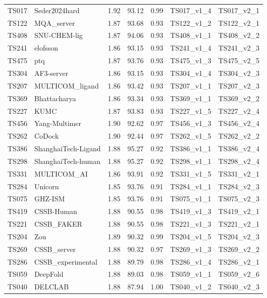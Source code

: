 \begin{longtable}{lllllll}
TS017 & Seder2024hard & 1.92 & 93.12 & 0.99 & TS017\_v1\_4 & TS017\_v2\_1 \\ 
TS122 & MQA\_server & 1.87 & 93.68 & 0.93 & TS122\_v1\_2 & TS122\_v2\_1 \\ 
TS408 & SNU-CHEM-lig & 1.87 & 94.06 & 0.93 & TS408\_v1\_1 & TS408\_v2\_2 \\ 
TS241 & elofsson & 1.86 & 93.15 & 0.93 & TS241\_v1\_4 & TS241\_v2\_3 \\ 
TS475 & ptq & 1.87 & 93.76 & 0.93 & TS475\_v1\_3 & TS475\_v2\_5 \\ 
TS304 & AF3-server & 1.86 & 93.15 & 0.93 & TS304\_v1\_4 & TS304\_v2\_3 \\ 
TS207 & MULTICOM\_ligand & 1.86 & 93.42 & 0.93 & TS207\_v1\_1 & TS207\_v2\_3 \\ 
TS369 & Bhattacharya & 1.86 & 93.34 & 0.93 & TS369\_v1\_1 & TS369\_v2\_2 \\ 
TS227 & KUMC & 1.87 & 93.83 & 0.93 & TS227\_v1\_5 & TS227\_v2\_4 \\ 
TS456 & Yang-Multimer & 1.90 & 92.62 & 0.97 & TS456\_v1\_3 & TS456\_v2\_4 \\ 
TS262 & CoDock & 1.90 & 92.44 & 0.97 & TS262\_v1\_5 & TS262\_v2\_2 \\ 
TS386 & ShanghaiTech-Ligand & 1.88 & 95.27 & 0.92 & TS386\_v1\_1 & TS386\_v2\_4 \\ 
TS298 & ShanghaiTech-human & 1.88 & 95.27 & 0.92 & TS298\_v1\_1 & TS298\_v2\_4 \\ 
TS331 & MULTICOM\_AI & 1.86 & 93.91 & 0.92 & TS331\_v1\_5 & TS331\_v2\_1 \\ 
TS284 & Unicorn & 1.85 & 93.76 & 0.91 & TS284\_v1\_1 & TS284\_v2\_3 \\ 
TS075 & GHZ-ISM & 1.85 & 93.76 & 0.91 & TS075\_v1\_1 & TS075\_v2\_3 \\ 
TS419 & CSSB-Human & 1.88 & 90.55 & 0.98 & TS419\_v1\_3 & TS419\_v2\_1 \\ 
TS221 & CSSB\_FAKER & 1.88 & 90.55 & 0.98 & TS221\_v1\_3 & TS221\_v2\_1 \\ 
TS204 & Zou & 1.89 & 90.32 & 0.99 & TS204\_v1\_5 & TS204\_v2\_3 \\ 
TS269 & CSSB\_server & 1.88 & 90.32 & 0.97 & TS269\_v1\_3 & TS269\_v2\_2 \\ 
TS286 & CSSB\_experimental & 1.88 & 89.79 & 0.98 & TS286\_v1\_4 & TS286\_v2\_1 \\ 
TS059 & DeepFold & 1.88 & 89.03 & 0.98 & TS059\_v1\_1 & TS059\_v2\_6 \\ 
TS040 & DELCLAB & 1.88 & 87.94 & 1.00 & TS040\_v1\_2 & TS040\_v2\_3 \\ 

\end{longtable}
